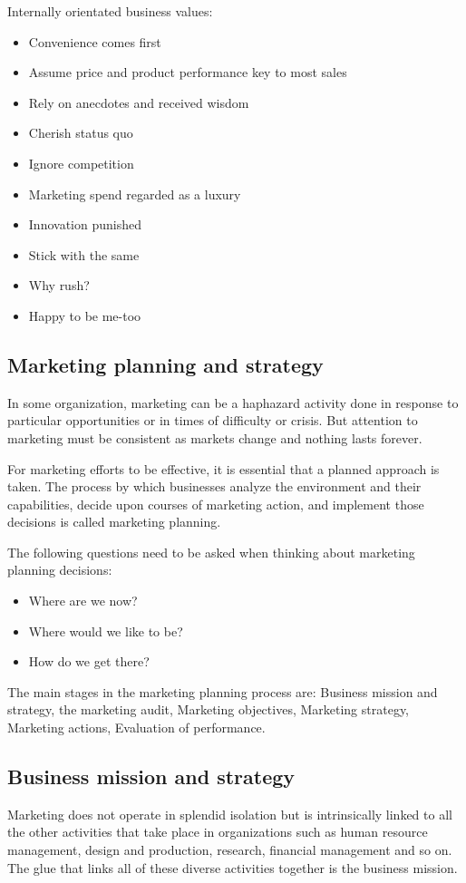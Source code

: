 \documentclass{article}
\begin{document}
Internally orientated business values:
\begin{itemize}
    \item Convenience comes first
    \item Assume price and product performance key to most sales
    \item Rely on anecdotes and received wisdom
    \item Cherish status quo
    \item Ignore competition
    \item Marketing spend regarded as a luxury
    \item Innovation punished
    \item Stick with the same
    \item Why rush?
    \item Happy to be me-too
\end{itemize}

\subsection{Marketing planning and strategy}
In some organization, marketing can be a haphazard activity done in response to particular opportunities or in times of difficulty or crisis. But attention to marketing must be consistent as markets change and nothing lasts forever. 

For marketing efforts to be effective, it is essential that a planned approach is taken. The process by which businesses analyze the environment and their capabilities, decide upon courses of marketing action, and implement those decisions is called marketing planning. 

The following questions need to be asked when thinking about marketing planning decisions:
\begin{itemize}
    \item Where are we now?
    \item Where would we like to be?
    \item How do we get there?
\end{itemize}

The main stages in the marketing planning process are: Business mission and strategy, the marketing audit, Marketing objectives, Marketing strategy, Marketing actions, Evaluation of performance.

\subsection{Business mission and strategy}
Marketing does not operate in splendid isolation but is intrinsically linked to all the other activities that take place in organizations such as human resource management, design and production, research, financial management and so on. The glue that links all of these diverse activities together is the business mission. 
\end{document}
